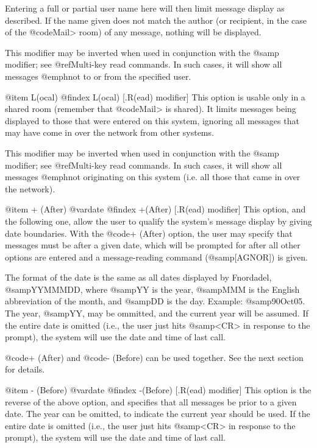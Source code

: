Entering a full or partial user name here will then
limit message display as described.  If the name given does
not match the author (or recipient, in the case of the @code{Mail>}
room) of any message, nothing will be displayed.

This modifier
may be inverted when used in conjunction with the @samp{~} modifier;
see @ref{Multi-key read commands}.  In such cases, it will show all messages
@emph{not} to or from the specified user.

@item L(ocal)
@findex L(ocal) [.R(ead) modifier]
This option is usable only in a shared room (remember
that @code{Mail>} is shared).  It limits messages being displayed to
those that were entered on this system, ignoring all messages
that may have come in over the network from other systems.

This modifier
may be inverted when used in conjunction with the @samp{~} modifier;
see @ref{Multi-key read commands}.  In such cases, it will show all messages
@emph{not} originating on this system (i.e. all those that came in
over the network).

@item + (After) @var{date}
@findex +(After) [.R(ead) modifier]
This option, and the following one, allow the user to
qualify the system's message display by giving date boundaries.
With the @code{+ (After)} option, the user may specify that messages
must be after a given date, which will be prompted for after all
other options are entered and a message-reading command
(@samp{[AGNOR]}) is given.

The format of the date is the same as all
dates displayed by Fnordadel, @samp{YYMMMDD}, where @samp{YY} is the year,
@samp{MMM} is the English abbreviation of the month, and @samp{DD} is the
day.  Example:  @samp{90Oct05}.  The year, @samp{YY}, may be ommitted, and
the current year will be assumed.  If the entire date is omitted (i.e.,
the user just hits @samp{<CR>} in response to the prompt), the system
will use the date and time of last call.

@code{+ (After)} and @code{- (Before)} can be used together.  See the next
section for details.

@item - (Before) @var{date}
@findex -(Before) [.R(ead) modifier]
This option is the reverse of the above option, and
specifies that all messages be prior to a given date.  The year can
be omitted, to indicate the current year should be used.  If the
entire date is omitted (i.e., the user just hits @samp{<CR>} in
response to the prompt), the system will use the date and time of last call.

